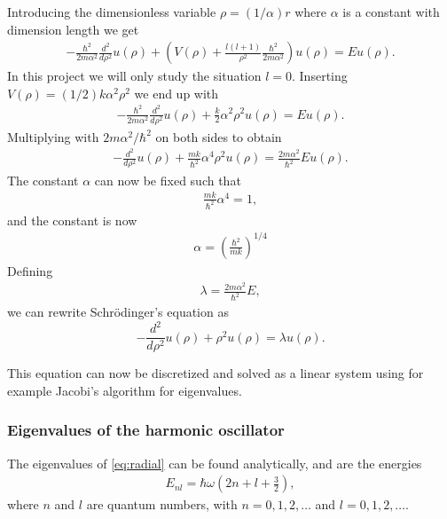 \documentclass[11pt,a4paper,english,draft]{article}
\numberwithin{equation}{section}
\begin{document}
Introducing the dimensionless variable $\rho = (1/\alpha) r$
where $\alpha$ is a constant with dimension length we get
\begin{gather}
  -\frac{\hbar^2}{2 m \alpha^2} \frac{d^2}{d\rho^2} u(\rho) 
       + \left ( V(\rho) + \frac{l (l + 1)}{\rho^2}
         \frac{\hbar^2}{2 m\alpha^2} \right ) u(\rho)  = E u(\rho) .
\end{gather}
In this project we will only study the situation $l=0$.
Inserting $V(\rho) = (1/2) k \alpha^2\rho^2$ we end up with
\begin{gather}
  -\frac{\hbar^2}{2 m \alpha^2} \frac{d^2}{d\rho^2} u(\rho) 
       + \frac{k}{2} \alpha^2\rho^2u(\rho)  = E u(\rho) .
\end{gather}
Multiplying with $2m\alpha^2/\hbar^2$ on both sides to obtain
\begin{gather}
  -\frac{d^2}{d\rho^2} u(\rho) 
       + \frac{mk}{\hbar^2} \alpha^4\rho^2u(\rho) 
       = \frac{2m\alpha^2}{\hbar^2}E u(\rho) .
\end{gather}
The constant $\alpha$ can now be fixed such that
\begin{gather}
\frac{mk}{\hbar^2} \alpha^4 = 1,
\end{gather}
and the constant is now
\begin{gather}
\alpha = \left(\frac{\hbar^2}{mk}\right)^{1/4}
\end{gather}
Defining 
\begin{gather}
\lambda = \frac{2m\alpha^2}{\hbar^2}E,
\end{gather}
we can rewrite Schrödinger's equation as
\begin{equation}
  -\frac{d^2}{d\rho^2} u(\rho) + \rho^2u(\rho)  = \lambda u(\rho) .
\end{equation}

This equation can now be discretized and solved as a linear system 
using for example Jacobi's algorithm for eigenvalues. 

\subsubsection{Eigenvalues of the harmonic oscillator}
The eigenvalues of \eqref{eq:radial} can be found analytically,
and are the energies
\begin{gather}
E_{nl}=  \hbar \omega \left(2n+l+\frac{3}{2}\right),
\end{gather}
where $n$ and $l$ are quantum numbers, with $n = 0, 1, 2, \dots$ and
$l = 0, 1, 2,  \dots $.
 
\end{document}
